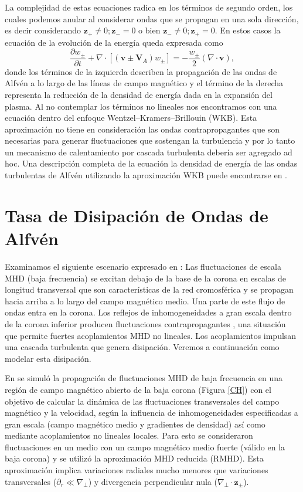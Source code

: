 \documentclass[a4paper,11pt]{report}
\begin{document}
La complejidad de estas ecuaciones radica en los términos de segundo orden, los cuales podemos anular al considerar ondas que se propagan en una sola dirección, es decir considerando $\boldsymbol{z}_+ \neq 0; \boldsymbol{z}_-=0$ o bien $\boldsymbol{z}_- \neq 0; \boldsymbol{z}_+=0$. En estos casos la ecuación de la evolución de la energía queda expresada como
\begin{equation}
  \frac{\partial w_\pm}{\partial t} + \nabla \cdot [(\boldsymbol{v}\pm \boldsymbol{V}_A)w_\pm] = - \frac{w_\pm}{2}(\nabla \cdot \boldsymbol{v}) ,\label{alfven_1}
\end{equation}
donde los términos de la izquierda describen la propagación de las ondas de Alfvén a lo largo de las líneas de campo magnético y el término de la derecha representa la reducción de la densidad de energía dada en la expansión del plasma. Al no contemplar los términos no lineales nos encontramos con una ecuación dentro del enfoque Wentzel–Kramers–Brillouin (WKB). Esta aproximación no tiene en consideración las ondas contrapropagantes que son necesarias para generar fluctuaciones que sostengan la turbulencia y por lo tanto un mecanismo de calentamiento por cascada turbulenta debería ser agregado ad hoc. Una descripción completa de la ecuación la densidad de energía de las ondas turbulentas de Alfvén utilizando la aproximación WKB puede encontrarse en \citet{vander_2014}.


\section{Tasa de Disipación de Ondas de Alfvén}\label{tasa}


Examinamos el siguiente escenario expresado en \citet{matthaeous_1999}: Las fluctuaciones de escala MHD (baja frecuencia) se excitan debajo de la base de la corona en escalas de longitud transversal que son características de la red cromosférica y se propagan hacia arriba a lo largo del campo magnético medio. Una parte de este flujo de ondas entra en la corona. Los reflejos de inhomogeneidades a gran escala dentro de la corona inferior producen fluctuaciones contrapropagantes \citep{zhou_1990}, una situación que permite fuertes acoplamientos MHD no lineales. Los acoplamientos impulsan una cascada turbulenta que genera disipación. Veremos a continuación como modelar esta disipación.

En \citet{dmitruk_2002} se simuló la propagación de fluctuaciones MHD de baja frecuencia en una región de campo magnético abierto de la baja corona (Figura \ref{CH}) con el objetivo de calcular la dinámica de las fluctuaciones transversales del campo magnético y la velocidad, según la influencia de inhomogeneidades especificadas a gran escala (campo magnético medio y gradientes de densidad) así como mediante acoplamientos no lineales locales. Para esto se consideraron fluctuaciones en un medio con un campo magnético medio fuerte (válido en la baja corona) y se utilizó la aproximación MHD reducida (RMHD). Esta aproximación implica variaciones radiales mucho menores que variaciones transversales ($\partial_r \ll \nabla_\perp$) y divergencia perpendicular nula ($\nabla_\perp \cdot \boldsymbol{z}_\pm$).
\end{document}
